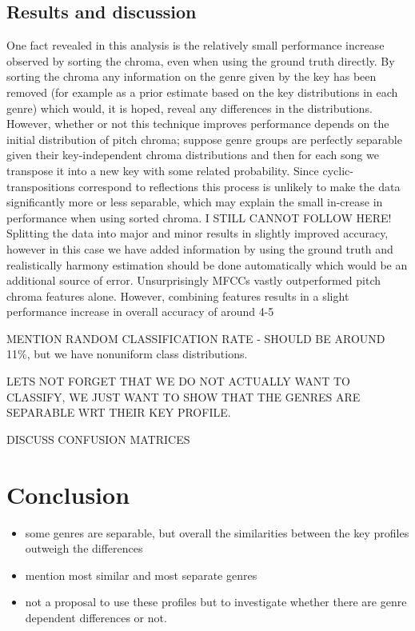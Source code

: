 \documentclass{article}
\begin{document}
\subsection{Results and discussion}
One fact revealed in this analysis is the relatively small performance increase observed by sorting the chroma, even when using the ground truth directly. By sorting the chroma any information on the genre given by the key has been removed (for example as a prior estimate based on the key distributions in each genre) which would, it is hoped, reveal any differences in the distributions. 
However, whether or not this technique improves performance depends on the initial distribution of pitch chroma; suppose genre groups are perfectly separable given their key-independent chroma distributions and then for each song we transpose it into a new key with some related probability. Since cyclic-transpositions correspond to reflections this process is unlikely to make the data significantly more or less separable, which may explain the small in-crease in performance when using sorted chroma. I STILL CANNOT FOLLOW HERE!
Splitting the data into major and minor results in slightly improved accuracy, however in this case we have added information by using the ground truth and realistically harmony estimation should be done automatically which would be an additional source of error.
	Unsurprisingly MFCCs vastly outperformed pitch chroma features alone. However, combining features results in a slight performance increase in overall accuracy of around 4-5%
    
    MENTION RANDOM CLASSIFICATION RATE - SHOULD BE AROUND 11\%, but we have nonuniform class distributions.
    
    LETS NOT FORGET THAT WE DO NOT ACTUALLY WANT TO CLASSIFY, WE JUST WANT TO SHOW THAT THE GENRES ARE SEPARABLE WRT THEIR KEY PROFILE.
    
    DISCUSS CONFUSION MATRICES

\section{Conclusion}
\begin{itemize}
    \item   some genres are separable, but overall the similarities between the key profiles outweigh the differences
    \item   mention most similar and most separate genres
    \item   not a proposal to use these profiles but to investigate whether there are genre dependent differences or not.
\end{itemize}



\end{document}
